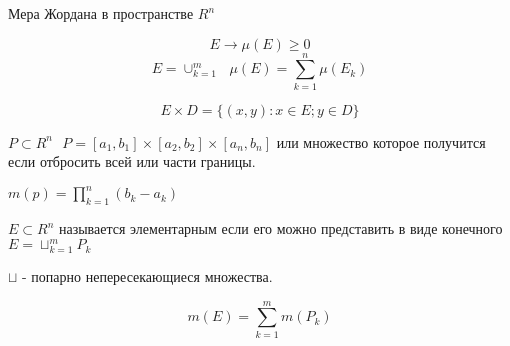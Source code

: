 \begin{title}[\Large]
  Мера Жордана в пространстве $R^n$
\end{title}

\begin{defin}
  $$
  E \to \mu (E) \ge 0
  $$
  $$
  E = \cup_{k=1}^m ~~~ \mu(E) = \sum_{k=1}^n \mu (E_k)
  $$
\end{defin}

\begin{defin}
   $$
   E \times D = \{ (x,y): x \in E; y \in D \}
   $$
\end{defin}

\begin{defin}[параллелипипеда]
  $P \subset R^n ~~~ P = [a_1, b_1] \times [a_2, b_2] \times [a_n, b_n]$ или
множество которое получится если отбросить всей или части границы.

  $m(p) = \prod_{k=1}^n (b_k - a_k)$

  $E \subset R^n$ называется элементарным если его можно представить в виде
конечного $E = \sqcup_{k=1}^m P_k$

  $\sqcup$ - попарно непересекающиеся множества.
\end{defin}

$$
m (E) = \sum_{k=1}^m m(P_k)
$$